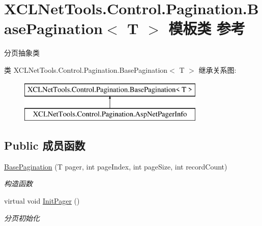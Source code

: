 \hypertarget{class_x_c_l_net_tools_1_1_control_1_1_pagination_1_1_base_pagination_3_01_t_01_4}{\section{X\-C\-L\-Net\-Tools.\-Control.\-Pagination.\-Base\-Pagination$<$ T $>$ 模板类 参考}
\label{class_x_c_l_net_tools_1_1_control_1_1_pagination_1_1_base_pagination_3_01_t_01_4}
}


分页抽象类  


类 X\-C\-L\-Net\-Tools.\-Control.\-Pagination.\-Base\-Pagination$<$ T $>$ 继承关系图\-:\begin{figure}[H]
\begin{center}
\leavevmode
\includegraphics[height=2.000000cm]{class_x_c_l_net_tools_1_1_control_1_1_pagination_1_1_base_pagination_3_01_t_01_4}
\end{center}
\end{figure}
\subsection*{Public 成员函数}
\begin{DoxyCompactItemize}
\item 
\hyperlink{class_x_c_l_net_tools_1_1_control_1_1_pagination_1_1_base_pagination_3_01_t_01_4_ae9e336c1452804e7d4de12ea9fa3ddde}{Base\-Pagination} (T pager, int page\-Index, int page\-Size, int record\-Count)
\begin{DoxyCompactList}\small\item\em 构造函数 \end{DoxyCompactList}\item 
virtual void \hyperlink{class_x_c_l_net_tools_1_1_control_1_1_pagination_1_1_base_pagination_3_01_t_01_4_ab3485196d5422f857f29f96bfbb2faa9}{Init\-Pager} ()
\begin{DoxyCompactList}\small\item\em 分页初始化 \end{DoxyCompactList}\end{DoxyCompactItemize}
